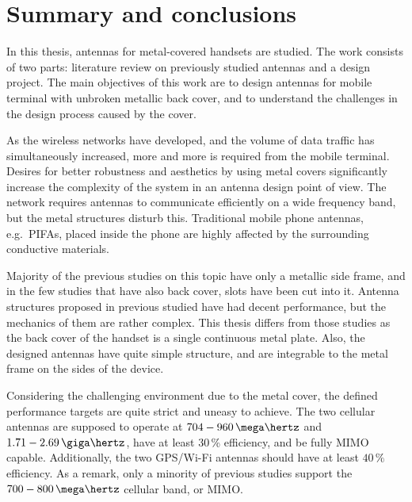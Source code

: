 \section{Summary and conclusions} 
\label{sec:conclusions}

\begin{comment}
\begin{itemize}
\item[--]yhteenveto mitä tehty
\item[--]päätulokset
\item[--]johtopäätökset
\item[--]oma arvio?
\end{itemize}
\end{comment}

In this thesis, antennas for metal-covered handsets are studied. The work consists of two parts: literature review on previously studied antennas and a design project. The main objectives of this work are to design antennas for mobile terminal with unbroken metallic back cover, and to understand the challenges in the design process caused by the cover.

As the wireless networks have developed, and the volume of data traffic has simultaneously increased, more and more is required from the mobile terminal. Desires for better robustness and aesthetics by using metal covers significantly increase the complexity of the system in an antenna design point of view. The network requires antennas to communicate efficiently on a wide frequency band, but the metal structures disturb this. Traditional mobile phone antennas, e.g.\ PIFAs, placed inside the phone are highly affected by the surrounding conductive materials.

Majority of the previous studies on this topic have only a metallic side frame, and in the few studies that have also back cover, slots have been cut into it. Antenna structures proposed in previous studied have had decent performance, but the mechanics of them are rather complex. This thesis differs from those studies as the back cover of the handset is a single continuous metal plate. Also, the designed antennas have quite simple structure, and are integrable to the metal frame on the sides of the device.

Considering the challenging environment due to the metal cover, the defined performance targets are quite strict and uneasy to achieve. The two cellular antennas are supposed to operate at $704-960\,\mega\hertz$ and $1.71-2.69\,\giga\hertz$, have at least 30\,\% efficiency, and be fully MIMO capable. Additionally, the two GPS/Wi-Fi antennas should have at least $40\,\%$ efficiency. As a remark, only a minority of previous studies support the $700-800\,\mega\hertz$ cellular band, or MIMO.

